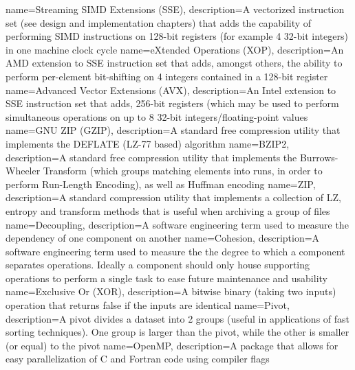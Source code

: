 {
  name={Streaming SIMD Extensions (SSE)},
  description={A vectorized instruction set (see design and implementation chapters) that adds the capability of performing SIMD instructions on 128-bit registers (for example
  4 32-bit integers) in one machine clock cycle}
 }
 {
  name={eXtended Operations (XOP)},
  description={An AMD extension to SSE instruction set that adds, amongst others, the ability to perform per-element bit-shifting on 4 integers contained in a 128-bit 
  register}
 }
 {
  name={Advanced Vector Extensions (AVX)},
  description={An Intel extension to SSE instruction set that adds, 256-bit registers (which may be used to perform simultaneous operations on up to 8 32-bit 
  integers/floating-point values}
 }
 {
  name={GNU ZIP (GZIP)},
  description={A standard free compression utility that implements the DEFLATE (LZ-77 based) algorithm}
 }
 {
  name={BZIP2},
  description={A standard free compression utility that implements the Burrows-Wheeler Transform (which groups matching elements into runs, in order to perform
  Run-Length Encoding), as well as Huffman encoding}
 }
 {
  name={ZIP},
  description={A standard compression utility that implements a collection of LZ, entropy and transform methods that is useful when archiving a group of files}
 }
 {
  name={Decoupling},
  description={A software engineering term used to measure the dependency of one component on another}
 }
 {
  name={Cohesion},
  description={A software engineering term used to measure the the degree to which a component separates operations. Ideally a component should only house supporting
  operations to perform a single task to ease future maintenance and usability}
 }
 {
  name={Exclusive Or (XOR)},
  description={A bitwise binary (taking two inputs) operation that returns false if the inputs are identical}
 }
 {
  name={Pivot},
  description={A pivot divides a dataset into 2 groups (useful in applications of fast sorting techniques). One group is larger than the pivot, while the other is smaller (or equal)
  to the pivot}
 }
 {
  name={OpenMP},
  description={A package that allows for easy parallelization of C and Fortran code using compiler flags}
 }
